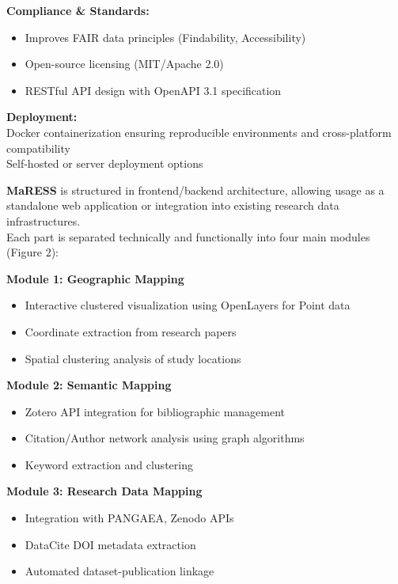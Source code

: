 \documentclass[a0,portrait]{a0poster}
\begin{document}
\begin{multicols}{3}
\begin{tcolorbox}[mainbox, title={\Large\textbf{Technical Architecture}}]
		\textbf{Compliance \& Standards:}
		\begin{itemize}[leftmargin=*]
			\item Improves FAIR data principles (Findability, Accessibility)
			\item Open-source licensing (MIT/Apache 2.0)
			\item RESTful API design with OpenAPI 3.1 specification
		\end{itemize}
		\textbf{Deployment:}
		\\Docker containerization ensuring reproducible environments and cross-platform compatibility
		\\ Self{-}hosted or server deployment options
	\end{tcolorbox}

	\begin{tcolorbox}[mainbox, title={\Large\textbf{Modular System Design}}]
		\vspace{0.5cm}
		\textbf{MaRESS} is structured in frontend/backend architecture, allowing usage as a standalone web application or
		integration into existing research data infrastructures.\\
		Each part is separated technically and functionally into four main modules (Figure 2):

		\vspace{0.5cm}
		\textbf{Module 1: Geographic Mapping}
		\begin{itemize}[leftmargin=*]
			\item Interactive clustered visualization using OpenLayers for Point data
			\item Coordinate extraction from research papers
			\item Spatial clustering analysis of study locations
		\end{itemize}

		\vspace{0.5cm}
		\textbf{Module 2: Semantic Mapping}
		\begin{itemize}[leftmargin=*]
			\item Zotero API integration for bibliographic management
			\item Citation/Author network analysis using graph algorithms
			\item Keyword extraction and clustering
		\end{itemize}

		\vspace{0.5cm}
		\textbf{Module 3: Research Data Mapping}
		\begin{itemize}[leftmargin=*]
			\item Integration with PANGAEA, Zenodo APIs
			\item DataCite DOI metadata extraction
			\item Automated dataset-publication linkage
		\end{itemize}


\end{tcolorbox}
\end{multicols}
\end{document}
